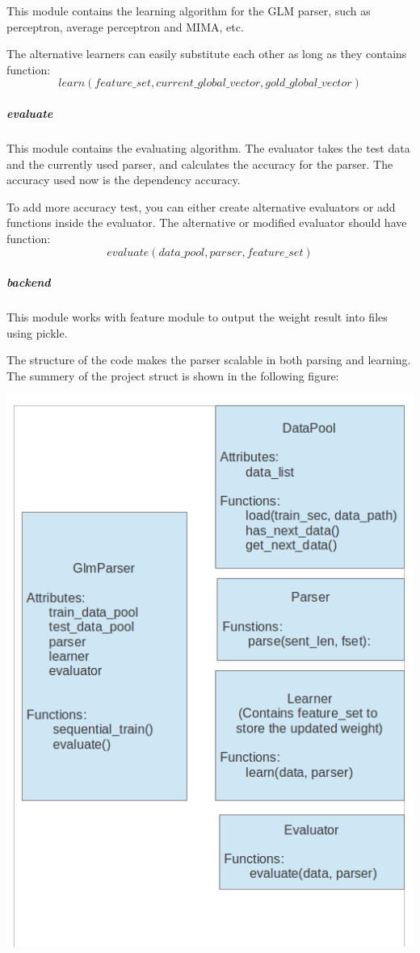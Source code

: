 \documentclass[11pt]{article}
\begin{document}
This module contains the learning algorithm for the GLM parser, such as perceptron, average perceptron and MIMA, etc. 

The alternative learners can easily substitute each other as long as they contains function: 
	$$ learn(feature\_set, current\_global\_vector, gold\_global\_vector) $$

\subparagraph{evaluate}

This module contains the evaluating algorithm. The evaluator takes the test data and the currently used parser, and calculates the accuracy for the parser. The accuracy used now is the dependency accuracy.

To add more accuracy test, you can either create alternative evaluators or add functions inside the evaluator. The alternative or modified evaluator should have function:
	$$ evaluate(data\_pool, parser, feature\_set) $$

\subparagraph{backend}

This module works with feature module to output the weight result into files using pickle.

The structure of the code makes the parser scalable in both parsing and learning. The summery of the project struct is shown in the following figure:

\includegraphics[scale=0.8]{project_struct}
\end{document}
